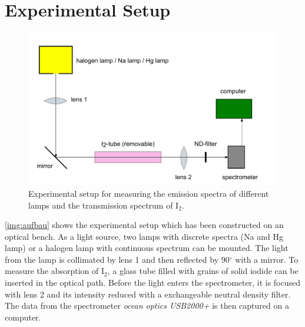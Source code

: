 \section{Experimental Setup}

\begin{figure}[H]
\begin{center}
  \includegraphics[width=\textwidth]{../img/aufbau.pdf}
  \caption[---]{Experimental setup for measuring the emission spectra of different lamps and
  the transmission spectrum of I$_2$.}
  \label{img:aufbau}
\end{center}
\end{figure}

\autoref{img:aufbau} shows the experimental setup which has been constructed on an optical bench.
As a light source, two lamps with discrete spectra (Na and Hg lamp) or a
halogen lamp with continuous spectrum can be mounted.
The light from the lamp is collimated by lens 1 and then reflected by 90$^{\circ}$ with a mirror.
To measure the absorption of I$_2$, a glass tube filled with grains of solid iodide can be inserted in the
optical path.
Before the light enters the spectrometer, it is focused with lens 2 and its intensity
reduced with a exchangeable neutral density filter.
The data from the spectrometer \emph{ocean optics USB2000+} is then captured on a computer.

